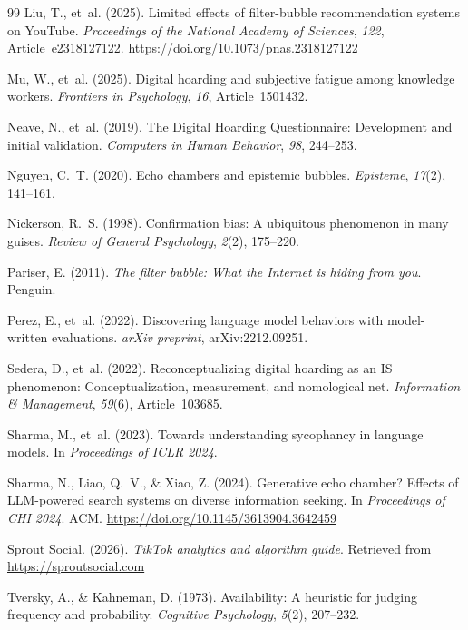 \documentclass[12pt,a4paper]{article}
\begin{document}
\begin{thebibliography}{99}
Liu, T., et~al. (2025).
Limited effects of filter-bubble recommendation systems on YouTube.
\emph{Proceedings of the National Academy of Sciences}, \emph{122}, Article~e2318127122.
\url{https://doi.org/10.1073/pnas.2318127122}

Mu, W., et~al. (2025).
Digital hoarding and subjective fatigue among knowledge workers.
\emph{Frontiers in Psychology}, \emph{16}, Article~1501432.

Neave, N., et~al. (2019).
The Digital Hoarding Questionnaire: Development and initial validation.
\emph{Computers in Human Behavior}, \emph{98}, 244--253.

Nguyen, C.~T. (2020).
Echo chambers and epistemic bubbles.
\emph{Episteme}, \emph{17}(2), 141--161.

Nickerson, R.~S. (1998).
Confirmation bias: A ubiquitous phenomenon in many guises.
\emph{Review of General Psychology}, \emph{2}(2), 175--220.

Pariser, E. (2011).
\emph{The filter bubble: What the Internet is hiding from you}.
Penguin.

Perez, E., et~al. (2022).
Discovering language model behaviors with model-written evaluations.
\emph{arXiv preprint}, arXiv:2212.09251.

Sedera, D., et~al. (2022).
Reconceptualizing digital hoarding as an IS phenomenon: Conceptualization, measurement, and nomological net.
\emph{Information \& Management}, \emph{59}(6), Article~103685.

Sharma, M., et~al. (2023).
Towards understanding sycophancy in language models.
In \emph{Proceedings of ICLR 2024}.

Sharma, N., Liao, Q.~V., \& Xiao, Z. (2024).
Generative echo chamber? Effects of LLM-powered search systems on diverse information seeking.
In \emph{Proceedings of CHI 2024}. ACM.
\url{https://doi.org/10.1145/3613904.3642459}

Sprout Social. (2026).
\emph{TikTok analytics and algorithm guide}.
Retrieved from \url{https://sproutsocial.com}

Tversky, A., \& Kahneman, D. (1973).
Availability: A heuristic for judging frequency and probability.
\emph{Cognitive Psychology}, \emph{5}(2), 207--232.


\end{thebibliography}
\end{document}
